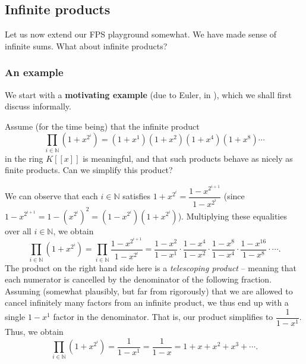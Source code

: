 \subsection{\label{sec.gf.prod}Infinite products}

Let us now extend our FPS playground somewhat. We have made sense of infinite
sums. What about infinite products?

\subsubsection{\label{subsec.gf.prod.exa}An example}

We start with a \textbf{motivating example} (due to Euler, in
\cite[\S 328--329]{Euler48}), which we shall first discuss informally.

Assume (for the time being) that the infinite product%
\begin{equation}
\prod_{i\in\mathbb{N}}\left(  1+x^{2^{i}}\right)  =\left(  1+x^{1}\right)
\left(  1+x^{2}\right)  \left(  1+x^{4}\right)  \left(  1+x^{8}\right)
\cdots\label{eq.fps.prod.binary.1}%
\end{equation}
in the ring $K\left[  \left[  x\right]  \right]  $ is meaningful, and that
such products behave as nicely as finite products. Can we simplify this product?

We can observe that each $i\in\mathbb{N}$ satisfies $1+x^{2^{i}}%
=\dfrac{1-x^{2^{i+1}}}{1-x^{2^{i}}}$ (since $1-x^{2^{i+1}}=1-\left(  x^{2^{i}%
}\right)  ^{2}=\left(  1-x^{2^{i}}\right)  \left(  1+x^{2^{i}}\right)  $).
Multiplying these equalities over all $i\in\mathbb{N}$, we obtain%
\[
\prod_{i\in\mathbb{N}}\left(  1+x^{2^{i}}\right)  =\prod_{i\in\mathbb{N}%
}\dfrac{1-x^{2^{i+1}}}{1-x^{2^{i}}}=\dfrac{1-x^{2}}{1-x^{1}}\cdot
\dfrac{1-x^{4}}{1-x^{2}}\cdot\dfrac{1-x^{8}}{1-x^{4}}\cdot\dfrac{1-x^{16}%
}{1-x^{8}}\cdot\cdots.
\]
The product on the right hand side here is a \emph{telescoping product} --
meaning that each numerator is cancelled by the denominator of the following
fraction. Assuming (somewhat plausibly, but far from rigorously) that we are
allowed to cancel infinitely many factors from an infinite product, we thus
end up with a single $1-x^{1}$ factor in the denominator. That is, our product
simplifies to $\dfrac{1}{1-x^{1}}$. Thus, we obtain%
\begin{equation}
\prod_{i\in\mathbb{N}}\left(  1+x^{2^{i}}\right)  =\dfrac{1}{1-x^{1}}%
=\dfrac{1}{1-x}=1+x+x^{2}+x^{3}+\cdots. \label{eq.fps.prod.binary.2}%
\end{equation}


